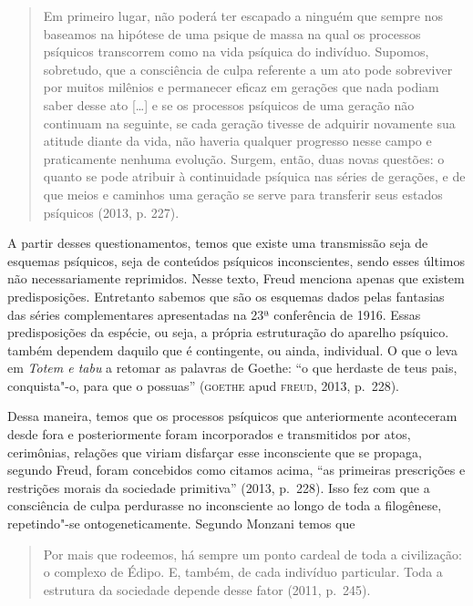 \begin{quote}
Em primeiro lugar, não poderá ter escapado a ninguém que sempre nos
baseamos na hipótese de uma psique de massa na qual os processos
psíquicos transcorrem como na vida psíquica do indivíduo. Supomos,
sobretudo, que a consciência de culpa referente a um ato pode sobreviver
por muitos milênios e permanecer eficaz em gerações que nada podiam
saber desse ato {[}\ldots{}{]} e se os processos psíquicos de uma geração não
continuam na seguinte, se cada geração tivesse de adquirir novamente sua
atitude diante da vida, não haveria qualquer progresso nesse campo e
praticamente nenhuma evolução. Surgem, então, duas novas questões: o
quanto se pode atribuir à continuidade psíquica nas séries de gerações,
e de que meios e caminhos uma geração se serve para transferir seus
estados psíquicos (2013, p. 227).
\end{quote}

A partir desses questionamentos, temos que existe uma transmissão seja
de esquemas psíquicos, seja de conteúdos psíquicos inconscientes, sendo
esses últimos não necessariamente reprimidos. Nesse texto, Freud
menciona apenas que existem predisposições. Entretanto sabemos que são
os esquemas dados pelas fantasias das séries complementares apresentadas
na 23ª conferência de 1916. Essas predisposições da espécie, ou seja, a
própria estruturação do aparelho psíquico. também dependem daquilo que é
contingente, ou ainda, individual. O que o leva em \emph{Totem e tabu} a
retomar as palavras de Goethe: ``o que herdaste de teus pais,
conquista"-o, para que o possuas'' (\textsc{goethe} apud \textsc{freud}, 2013, p.~228).

Dessa maneira, temos que os processos psíquicos que anteriormente
aconteceram desde fora e posteriormente foram incorporados e
transmitidos por atos, cerimônias, relações que viriam disfarçar esse
inconsciente que se propaga, segundo Freud, foram concebidos como
citamos acima, ``as primeiras prescrições e restrições morais da
sociedade primitiva'' (2013, p.~228). Isso fez com que a
consciência de culpa perdurasse no inconsciente ao longo de toda a
filogênese, repetindo"-se ontogeneticamente. Segundo Monzani temos que

\begin{quote}
Por mais que rodeemos, há sempre um ponto cardeal de toda a civilização:
o complexo de Édipo. E, também, de cada indivíduo particular. Toda a
estrutura da sociedade depende desse fator (2011, p.~245).
\end{quote}

